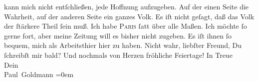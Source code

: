 \begin{ledgroupsized}[t]{13cm}
               kann mich nicht entſchließen, jede Hoffnung aufzugeben. Auf der einen Seite die
               Wahrheit, auf der anderen Seite ein ganzes Volk. Es iſt nicht geſagt, {\pb}daß das Volk der ſtärkere Theil ſein
               muß.\pend
           \pstart
           Ich habe \textsc{Paris} ſatt über alle Maßen. Ich möchte ſo gerne fort, aber meine Zeitung will \strikeout{\textcolor{gray}{m}} es bisher nicht zugeben. Es iſt ihnen ſo bequem, mich als  Arbeitsthier hier zu haben.\pend
           \pstart
           Nicht wahr, liebſter Freund, Du ſchreibſt mir bald?\pend
           \pstart
           Und nochmals von Herzen fröhliche Feiertage!\pend
           \pstart
           In Treue {\\[\baselineskip]}Dein {\\[\baselineskip]}\spacefill\mbox{Paul Goldmann}\pend
           \leftskip=0em{}
         
         \endnumbering{}\end{ledgroupsized}  \newcommand{\dateiname}{L02834}\newcommand{\titel}{Paul Goldmann an Arthur Schnitzler, 23. 12. [1897]}\newcommand{\editorInnen}{Martin Anton Müller und Laura Untner}
      